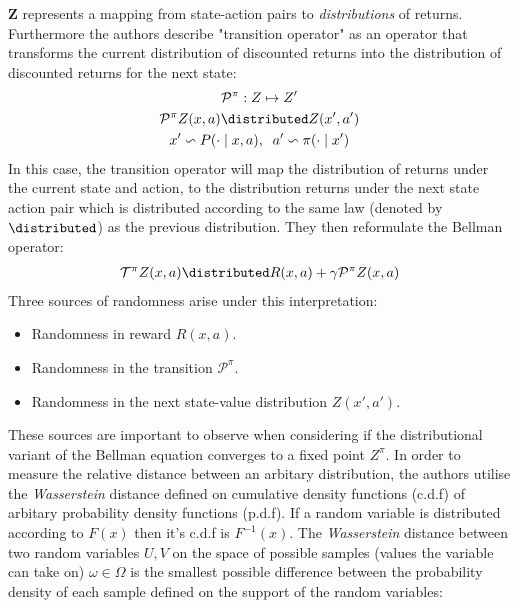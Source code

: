 $\mathbf{Z}$ represents a mapping from state-action pairs to \emph{distributions} of returns.
Furthermore the authors describe "transition operator" as an operator that transforms the current
distribution of discounted returns into the distribution of discounted returns for the next state:
\begin{equation}
    \begin{gathered}
        \mathcal{P}^\pi : Z \mapsto Z'\\
        \mathcal{P}^\pi Z(x,a) \distributed Z(x',a') \\
        x' \backsim P(\cdot \mid x,a), \;\; a' \backsim \pi(\cdot \mid x')
    \end{gathered}
\end{equation}
In this case, the transition operator will map the distribution
of returns under the current state and action, to the distribution returns under the next state action  pair which
is distributed according to the same law (denoted by $\distributed$) as the previous distribution. They then
reformulate the Bellman operator:
\begin{equation}
    \begin{gathered}
        \mathcal{T}^\pi Z(x,a) \distributed R(x,a) + \gamma \mathcal{P}^\pi Z(x,a)
    \end{gathered}
\end{equation}
Three sources of randomness arise under this interpretation:
\begin{itemize}
    \item Randomness in reward $R(x,a)$.
    \item Randomness in the transition $\mathcal{P}^\pi$.
    \item Randomness in the next state-value distribution $Z(x',a')$.
\end{itemize}
These sources are important to observe when considering if the distributional variant of the Bellman equation
converges to a fixed point $Z^\pi$. In order to measure the relative distance between an arbitary distribution,
the authors utilise the \emph{Wasserstein} distance defined on cumulative density functions (c.d.f) of arbitary probability
density functions (p.d.f). If a random variable is distributed according to $F(x)$ then it's c.d.f is $F^{-1}(x)$. The \emph{Wasserstein} distance
between two random variables $U, V$ on the space of possible samples (values the variable can take on) $\omega \in \Omega$
is the smallest possible difference between the probability density of each sample defined on the support of the random variables:
